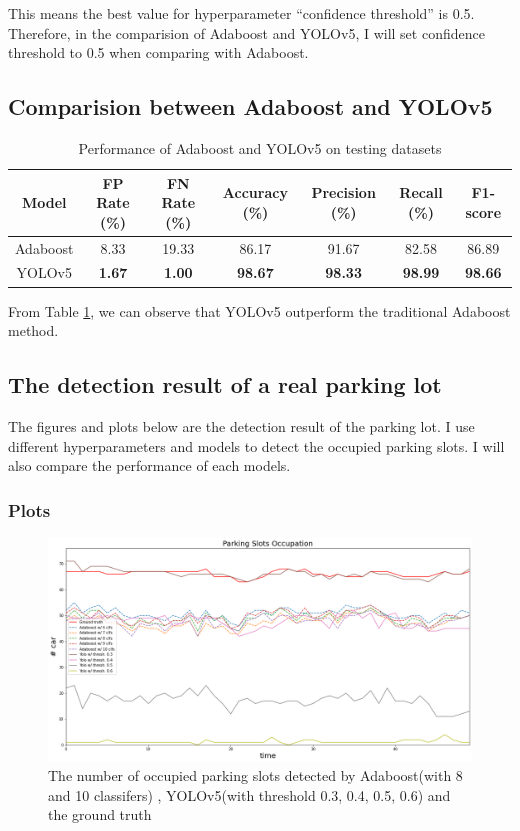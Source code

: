 \documentclass{article}[12pt, twocolumn]
\begin{document}
This means the best value for hyperparameter ``confidence threshold'' is 0.5.
Therefore, in the comparision of Adaboost and YOLOv5, I will set confidence threshold to 0.5
when comparing with Adaboost.

\subsection{Comparision between Adaboost and YOLOv5}

\begin{table}[H]
    \centering
    \caption{Performance of Adaboost and YOLOv5 on testing datasets}
    \begin{tabular}{@{}ccccccc@{}}
    \toprule
    Model    & FP Rate (\%)  & FN Rate (\%)  & Accuracy (\%)  & Precision (\%) & Recall (\%)    & F1-score       \\ \midrule
    Adaboost & 8.33          & 19.33         & 86.17          & 91.67          & 82.58          & 86.89          \\
    YOLOv5   & \textbf{1.67} & \textbf{1.00} & \textbf{98.67} & \textbf{98.33} & \textbf{98.99} & \textbf{98.66} \\ \bottomrule
    \end{tabular}
    \label{tab:com_ada_yolo}
\end{table}

From Table \ref{tab:com_ada_yolo}, we can observe that YOLOv5 outperform the traditional
Adaboost method.

\subsection{The detection result of a real parking lot}

The figures and plots below are the detection result of the parking lot. I use different
hyperparameters and models to detect the occupied parking slots. I will also compare the 
performance of each models.

\subsubsection{Plots}

\begin{figure}[H]
    \centering
    \includegraphics[width=\textwidth]{figure/Parking_Slots_Occupation.png}
    \caption{The number of occupied parking slots detected by Adaboost(with 8 and 10 classifers)
    , YOLOv5(with threshold 0.3, 0.4, 0.5, 0.6) and the ground truth}
\end{figure}
\end{document}
